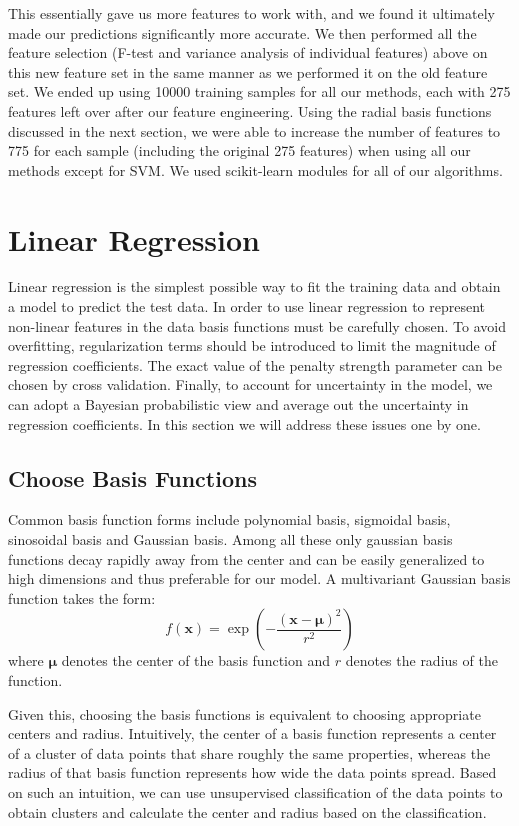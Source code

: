 \documentclass[11pt]{article}
\begin{document}
This essentially gave us more features to work with, and we found it ultimately made our predictions significantly more accurate. We then performed all the feature selection (F-test and variance analysis of individual features) above on this new feature set in the same manner as we performed it on the old feature set. We ended up using 10000 training samples for all our methods, each with 275 features left over after our feature engineering. Using the radial basis functions discussed in the next section, we were able to increase the number of features to 775 for each sample (including the original 275 features) when using all our methods except for SVM. We used scikit-learn modules for all of our algorithms.


\section{Linear Regression}
Linear regression is the simplest possible way to fit the training data and obtain a model to predict the test data. In order to use linear regression to represent non-linear features in the data basis functions must be carefully chosen. To avoid overfitting, regularization terms should be introduced to limit the magnitude of regression coefficients. The exact value of the penalty strength parameter can be chosen by cross validation. Finally, to account for uncertainty in the model, we can adopt a Bayesian probabilistic view and average out the uncertainty in regression coefficients. In this section we will address these issues one by one.
\subsection{Choose Basis Functions}\label{choose basis function}
Common basis function forms include polynomial basis, sigmoidal basis, sinosoidal basis and Gaussian basis. Among all these only gaussian basis functions decay rapidly away from the center and can be easily generalized to high dimensions and thus preferable for our model. A multivariant Gaussian basis function takes the form:
$$f(\textbf{x}) = \exp \left(-\frac{(\textbf{x} - \boldsymbol{\mu})^2}{r^2}\right)$$
where $\boldsymbol{\mu}$ denotes the center of the basis function and $r$ denotes the radius of the function. 

Given this, choosing the basis functions is equivalent to choosing appropriate centers and radius. Intuitively, the center of a basis function represents a center of a cluster of data points that share roughly the same properties, whereas the radius of that basis function represents how wide the data points spread. Based on such an intuition, we can use unsupervised classification of the data points to obtain clusters and calculate the center and radius based on the classification.
\end{document}
